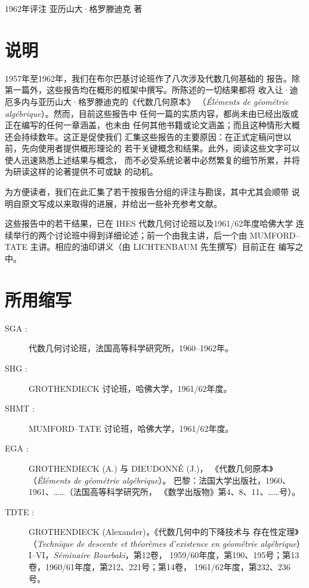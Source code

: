 \unit{1962年评注}
%
  {亚历山大·格罗滕迪克 著}

\section*{说明}

1957年至1962年，我们在布尔巴基讨论班作了八次涉及代数几何基础的
报告。除第一篇外，这些报告均在概形的框架中撰写。所陈述的一切结果都将
收入让·迪厄多内与亚历山大·格罗滕迪克的《代数几何原本》
（\emph{Éléments de géométrie algébrique}）。然而，目前这些报告中
任何一篇的实质内容，都尚未由已经出版或正在编写的任何一章涵盖，也未由
任何其他书籍或论文涵盖；而且这种情形大概还会持续数年。这正是促使我们
汇集这些报告的主要原因：在正式定稿问世以前，先向使用者提供概形理论的
若干关键概念和结果。此外，阅读这些文字可以使人迅速熟悉上述结果与概念，
而不必受系统论著中必然繁复的细节所累，并将为研读这样的论著提供不可或缺
的动机。

为方便读者，我们在此汇集了若干按报告分组的评注与勘误，其中尤其会顺带
说明自原文写成以来取得的进展，并给出一些补充参考文献。

这些报告中的若干结果，已在 IHES 代数几何讨论班以及1961/62年度哈佛大学
连续举行的两个讨论班中得到详细论述；前一个由我主讲，后一个由
MUMFORD--TATE 主讲。相应的油印讲义（由 LICHTENBAUM 先生撰写）目前正在
编写之中。

\section*{所用缩写}

\begin{description}
\item[SGA :] 代数几何讨论班，法国高等科学研究所，1960--1962年。

\item[SHG :] GROTHENDIECK 讨论班，哈佛大学，1961/62年度。

\item[SHMT :] MUMFORD--TATE 讨论班，哈佛大学，1961/62年度。

\item[EGA :] GROTHENDIECK (A.) 与 DIEUDONNÉ (J.)，
《代数几何原本》（\emph{Éléments de géométrie algébrique}）。
巴黎：法国大学出版社，1960、1961、……（法国高等科学研究所，
《数学出版物》第4、8、11、……号）。

\item[TDTE :] GROTHENDIECK (Alexander)，《代数几何中的下降技术与
存在性定理》（\emph{Technique de descente et théorèmes d'existence
en géométrie algébrique}）I--VI，\emph{Séminaire Bourbaki}，第12卷，
1959/60年度，第190、195号；第13卷，1960/61年度，第212、221号；第14卷，
1961/62年度，第232、236号。
\end{description}
